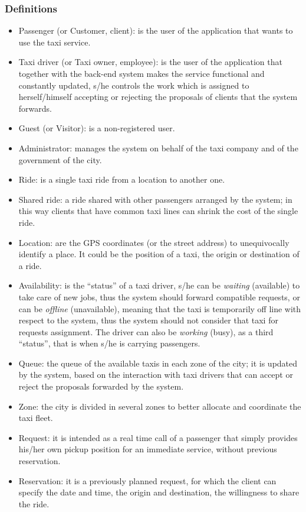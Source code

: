 \documentclass[a4paper,11pt]{report} %
\begin{document}
	\subsubsection{Definitions}
		\begin{itemize}
			\item Passenger (or Customer, client): is the user of the application that wants to use the taxi service.
			\item Taxi driver (or Taxi owner, employee): is the user of the application that together with the back-end system makes the service functional and constantly updated, s/he controls the work which is assigned to herself/himself accepting or rejecting the proposals of clients that the system forwards. 
			\item Guest (or Visitor): is a non-registered user.
			\item Administrator: manages the system on behalf of the taxi company and of the government of the city.
			\item Ride: is a single taxi ride from a location to another one.
			\item Shared ride: a ride shared with other passengers arranged by the system; in this way clients that have common taxi lines can shrink the cost of the single ride.
			\item Location: are the GPS coordinates (or the street address) to unequivocally identify a place. It could be the position of a taxi, the origin or destination of a ride.
			\item Availability: is the ``status'' of a taxi driver, s/he can be \textit{waiting} (available) to take care of new jobs, thus the system should forward compatible requests, or can be \textit{offline} (unavailable), meaning that the taxi is temporarily off line with respect to the system, thus the system should not consider that taxi for requests assignment. The driver can also be \textit{working} (busy), as a third ``status'', that is when s/he is carrying passengers.
			\item Queue: the queue of the available taxis in each zone of the city; it is updated by the system, based on the interaction with taxi drivers that can accept or reject the proposals forwarded by the system. 
			\item Zone: the city is divided in several zones to better allocate and coordinate the taxi fleet.
			\item Request: it is intended as a real time call of a passenger that simply provides his/her own pickup position for an immediate service, without previous reservation.
			\item Reservation: it is a previously planned request, for which the client can specify the date and time, the origin and destination, the willingness to share the ride.
		\end{itemize}
		
\end{document}
